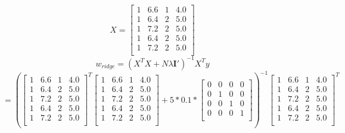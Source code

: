 \documentclass[12pt]{article}
\begin{document}
\section{}
\[ X = \begin{bmatrix}
	1 & 6.6 & 1 & 4.0 \\
	1 & 6.4 & 2 & 5.0 \\
	1 & 7.2 & 2 & 5.0 \\
	1 & 6.4 & 2 & 5.0 \\
	1 & 7.2 & 2 & 5.0 \\
\end{bmatrix} \]
\[ w_{ridge} = \left(X^TX+N\lambda \textbf{I}'\right)^{-1}X^Ty \]
\[
	= \left(
	\begin{bmatrix}
		1 & 6.6 & 1 & 4.0 \\
		1 & 6.4 & 2 & 5.0 \\
		1 & 7.2 & 2 & 5.0 \\
		1 & 6.4 & 2 & 5.0 \\
		1 & 7.2 & 2 & 5.0 \\
	\end{bmatrix}^T
	\begin{bmatrix}
		1 & 6.6 & 1 & 4.0 \\
		1 & 6.4 & 2 & 5.0 \\
		1 & 7.2 & 2 & 5.0 \\
		1 & 6.4 & 2 & 5.0 \\
		1 & 7.2 & 2 & 5.0 \\
	\end{bmatrix}+5 * 0.1 * 
\begin{bmatrix}
	0 & 0 & 0 & 0 \\
	0 & 1 & 0 & 0 \\
	0 & 0 & 1 & 0 \\
	0 & 0 & 0 & 1 \\
\end{bmatrix}\right)^{-1}
\begin{bmatrix}
	1 & 6.6 & 1 & 4.0 \\
	1 & 6.4 & 2 & 5.0 \\
	1 & 7.2 & 2 & 5.0 \\
	1 & 6.4 & 2 & 5.0 \\
	1 & 7.2 & 2 & 5.0 \\
\end{bmatrix}^T
\]
\end{document}
